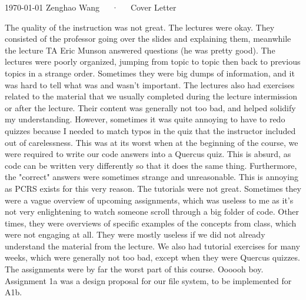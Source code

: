 \documentclass[11pt, a4paper]{awesome-cv}
\begin{document}
\makecvheader[R]

\makecvfooter
{\today}
{Zenghao Wang~~~·~~~Cover Letter}
{}

\makelettertitle

\begin{cvletter}



  The quality of the instruction was not great. The lectures were okay. They consisted of the professor going over the slides and explaining them, meanwhile the lecture TA Eric Munson answered questions (he was pretty good). The lectures were poorly organized, jumping from topic to topic then back to previous topics in a strange order. Sometimes they were big dumps of information, and it was hard to tell what was and wasn't important. The lectures also had exercises related to the material that we usually completed during the lecture intermission or after the lecture. Their content was generally not too bad, and helped solidify my understanding. However, sometimes it was quite annoying to have to redo quizzes because I needed to match typos in the quiz that the instructor included out of carelessness. This was at its worst when at the beginning of the course, we were required to write our code answers into a Quercus quiz. This is absurd, as code can be written very differently so that it does the same thing. Furthermore, the "correct" answers were sometimes strange and unreasonable. This is annoying as PCRS exists for this very reason. The tutorials were not great. Sometimes they were a vague overview of upcoming assignments, which was useless to me as it's not very enlightening to watch someone scroll through a big folder of code. Other times, they were overviews of specific examples of the concepts from class, which were not engaging at all. They were mostly useless if we did not already understand the material from the lecture. We also had tutorial exercises for many weeks, which were generally not too bad, except when they were Quercus quizzes. The assignments were by far the worst part of this course. Oooooh boy. Assignment 1a was a design proposal for our file system, to be implemented for A1b.
\end{cvletter}


\makeletterclosing
\end{document}

